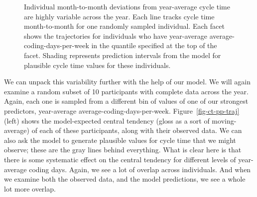 \documentclass[
  sn-mathphys-ay,
]{sn-jnl}
\begin{document}
\begin{figure}


\caption[Individual month-to-month deviations from year-average cycle
time are highly variable across the
year]{\label{fig-wi-ct-traj}Individual month-to-month deviations from
year-average cycle time are highly variable across the year. Each line
tracks cycle time month-to-month for one randomly sampled individual.
Each facet shows the trajectories for individuals who have year-average
average-coding-days-per-week in the quantile specified at the top of the
facet. Shading represents prediction intervals from the model for
plausible cycle time values for these individuals.}

\end{figure}%

We can unpack this variability further with the help of our model. We
will again examine a random subset of 10 participants with complete data
across the year. Again, each one is sampled from a different bin of
values of one of our strongest predictors, year-average
average-coding-days-per-week. Figure~\ref{fig-ct-pp-traj} (left) shows
the model-expected central tendency (gloss as a sort of moving-average)
of each of these participants, along with their observed data. We can
also ask the model to generate plausible values for cycle time that we
might observe; these are the gray lines behind everything. What is clear
here is that there is some systematic effect on the central tendency for
different levels of year-average coding days. Again, we see a lot of
overlap across individuals. And when we examine both the observed data,
and the model predictions, we see a whole lot more overlap.
\end{document}
